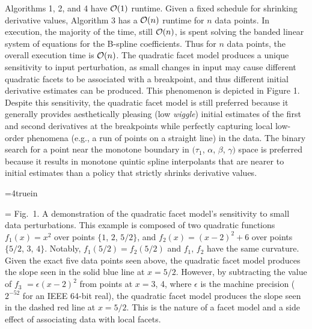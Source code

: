 Algorithms 1, 2, and 4 have ${\cal O}(1)$ runtime. Given a fixed
schedule for shrinking derivative values, Algorithm 3 has a ${\cal
  O}(n)$ runtime for $n$ data points. In execution, the majority of
the time, still ${\cal O}(n)$, is spent solving the banded linear
system of equations for the B-spline coefficients. Thus for $n$ data
points, the overall execution time is ${\cal O}(n)$. The quadratic
facet model produces a unique sensitivity to input perturbation, as
small changes in input may cause different quadratic facets to be
associated with a breakpoint, and thus different initial derivative
estimates can be produced. This phenomenon is depicted in Figure
1. Despite this sensitivity, the quadratic facet model is still
preferred because it generally provides aesthetically pleasing (low
{\it wiggle}) initial estimates of the first and second derivatives at
the breakpoints while perfectly capturing local low-order phenomena
(e.g., a run of points on a straight line) in the data. The binary
search for a point near the monotone boundary in $(\tau_1$, $\alpha$,
$\beta$, $\gamma)$ space is preferred because it results in monotone
quintic spline interpolants that are nearer to initial estimates than
a policy that strictly shrinks derivative values.

\topinsert
\centerline{\epsfxsize=4truein }
{\everymath={\scriptstyle}
\narrower\noindent\rmVIII Fig.\ 1. A demonstration of the quadratic
  facet model's sensitivity to small data perturbations. This example is
  composed of two quadratic functions $f_1(x) = x^2$ over points $\{1$,
  $2$, $5/2\}$, and $f_2(x) = (x-2)^2 + 6$ over points $\{5/2$, $3$,
  $4\}$. Notably, $f_1(5/2) = f_2(5/2)$ and $f_1$, $f_2$ have the same
  curvature. Given the exact five data points seen above, the quadratic
  facet model produces the slope seen in the solid blue line at $x = 5/2$.
  However, by subtracting the value of $f_3$ $= \epsilon(x-2)^2$ from
  points at $x = 3$, 4, where $\epsilon$ is the machine precision
  ($2^{-52}$ for an IEEE 64-bit real), the quadratic facet model produces
  the slope seen in the dashed red line at $x = 5/2$. This is the nature
  of a facet model and a side effect of associating data with local facets.
\par} \endinsert
